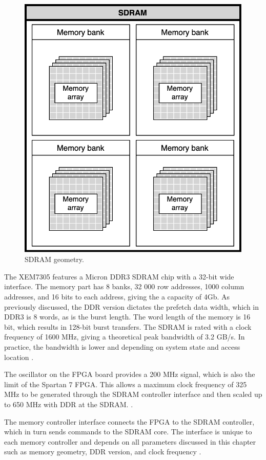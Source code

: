 \documentclass[12pt]{report}
\begin{document}
\begin{figure}[h]
    \centering
    \includegraphics[scale=0.3]{figures/sdram_bank_array.png}
    \caption{SDRAM geometry.}
    \label{fig:8}
\end{figure}

The XEM7305 features a Micron DDR3 SDRAM chip with a 32-bit wide interface. The memory part has 8 banks, 32 000 row addresses, 1000 column addresses, and 16 bits to each address, giving the a capacity of 4Gb. As previously discussed, the DDR version dictates the prefetch data width, which in DDR3 is 8 words, as is the burst length. The word length of the memory is 16 bit, which results in 128-bit burst transfers. The SDRAM is rated with a clock frequency of 1600 MHz, giving a theoretical peak bandwidth of 3.2 GB/s. In practice, the bandwidth is lower and depending on system state and access location \citep{XEM7305Man}.
\par
The oscillator on the FPGA board provides a 200 MHz signal, which is also the limit of the Spartan 7 FPGA. This allows a maximum clock frequency of 325 MHz to be generated through the SDRAM controller interface and then scaled up to 650 MHz with DDR at the SDRAM.
\citep{XEM7305Man} \citep{MicronSDRAM}.
\par
The memory controller interface connects the FPGA to the SDRAM controller, which in turn sends commands to the SDRAM core. The interface is unique to each memory controller and depends on all parameters discussed in this chapter such as memory geometry, DDR version, and clock frequency \citep{XEM7305Man}.
\end{document}
